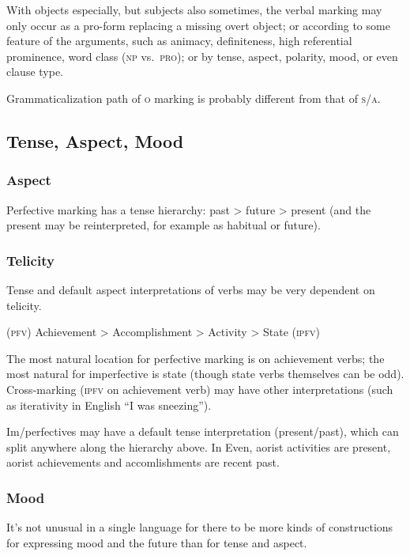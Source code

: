 \documentclass[11pt]{article}
\newcommand{\I}[1]{\textsc{#1}}   %
\begin{document}
With objects especially, but subjects also sometimes, the verbal
marking may only occur as a pro-form replacing a missing overt object;
or according to some feature of the arguments, such as animacy,
definiteness, high referential prominence, word class (\I{np}
vs.\ \I{pro}); or by tense, aspect, polarity, mood, or even clause
type.

Grammaticalization path of \I{o} marking is probably different from
that of \I{s/a}.


\subsection{Tense, Aspect, Mood}

\subsubsection{Aspect} Perfective marking has a tense hierarchy: past
> future > present (and the present may be reinterpreted, for example
as habitual or future).

\subsubsection{Telicity}
Tense and default aspect interpretations of verbs may be very
dependent on telicity.
\begin{center}
  \I{(pfv)} Achievement > Accomplishment > Activity > State \I{(ipfv)}
\end{center}
\noindent The most natural location for perfective marking is on
achievement verbs; the most natural for imperfective is state (though
state verbs themselves can be odd).  Cross-marking (\I{ipfv} on
achievement verb) may have other interpretations (such as iterativity
in English ``I was sneezing'').

Im/perfectives may have a default tense interpretation (present/past),
which can split anywhere along the hierarchy above.  In Even, aorist
activities are present, aorist achievements and accomlishments are
recent past.

\subsubsection{Mood}
It's not unusual in a single language for there to be more kinds of
constructions for expressing mood and the future than for tense and
aspect.
\end{document}

